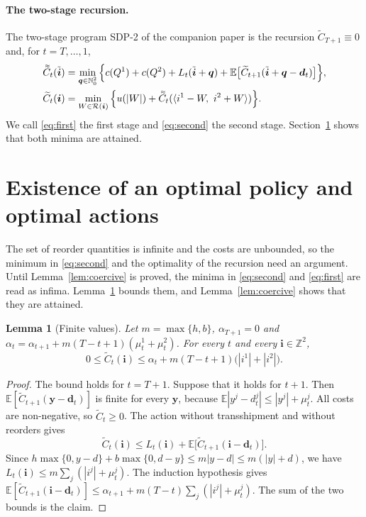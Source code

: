 \documentclass[11pt]{article}
\DeclareRobustCommand{\dbtilde}[1]{\accentset{\approx}{#1}}
\renewcommand{\vec}[1]{\boldsymbol{#1}}
\newcommand{\E}{\mathbb{E}}
\newcommand{\Z}{\mathbb{Z}}
\newcommand{\N}{\mathbb{N}_0}
\newcommand{\R}{\mathcal{R}}
\newcommand{\Ct}{\widetilde{C}}
\newcommand{\Cq}{\dbtilde{C}}
\newtheorem{lemma}{Lemma}
\theoremstyle{definition}
\begin{document}
\paragraph{The two-stage recursion.} The two-stage program SDP-2 of the companion paper is the recursion $\Ct_{T+1}\equiv 0$ and, for $t=T,\ldots,1$,
\begin{align}
\Cq_t(\tilde{\vec{i}})&=\min_{\vec{q}\in\N^2}\Big\{c(Q^1)+c(Q^2)+L_t(\tilde{\vec{i}}+\vec{q})+\E\big[\Ct_{t+1}(\tilde{\vec{i}}+\vec{q}-\vec{d}_t)\big]\Big\},\label{eq:second}\\
\Ct_t(\vec{i})&=\min_{W\in\R(\vec{i})}\Big\{u(|W|)+\Cq_t(\langle i^1-W,\ i^2+W\rangle)\Big\}.\label{eq:first}
\end{align}
We call \eqref{eq:first} the first stage and \eqref{eq:second} the second stage. Section~\ref{sec:existence} shows that both minima are attained.

\section{Existence of an optimal policy and optimal actions}\label{sec:existence}

The set of reorder quantities is infinite and the costs are unbounded, so the minimum in \eqref{eq:second} and the optimality of the recursion need an argument. Until Lemma~\ref{lem:coercive} is proved, the minima in \eqref{eq:second} and \eqref{eq:first} are read as infima. Lemma~\ref{lem:bound} bounds them, and Lemma~\ref{lem:coercive} shows that they are attained.

\begin{lemma}[Finite values]\label{lem:bound}
Let $m=\max\{h,b\}$, $\alpha_{T+1}=0$ and $\alpha_t=\alpha_{t+1}+m(T-t+1)(\mu^1_t+\mu^2_t)$. For every $t$ and every $\vec{i}\in\Z^2$,
\[
0\le \Ct_t(\vec{i})\le \alpha_t+m(T-t+1)\big(|i^1|+|i^2|\big).
\]
\end{lemma}

\begin{proof}
The bound holds for $t=T+1$. Suppose that it holds for $t+1$. Then $\E[\Ct_{t+1}(\vec{y}-\vec{d}_t)]$ is finite for every $\vec{y}$, because $\E|y^j-d^j_t|\le |y^j|+\mu^j_t$. All costs are non-negative, so $\Ct_t\ge 0$. The action without transshipment and without reorders gives
\[
\Ct_t(\vec{i})\le L_t(\vec{i})+\E\big[\Ct_{t+1}(\vec{i}-\vec{d}_t)\big].
\]
Since $h\max\{0,y-d\}+b\max\{0,d-y\}\le m|y-d|\le m(|y|+d)$, we have $L_t(\vec{i})\le m\sum_j(|i^j|+\mu^j_t)$. The induction hypothesis gives $\E[\Ct_{t+1}(\vec{i}-\vec{d}_t)]\le\alpha_{t+1}+m(T-t)\sum_j(|i^j|+\mu^j_t)$. The sum of the two bounds is the claim.
\end{proof}
\end{document}
